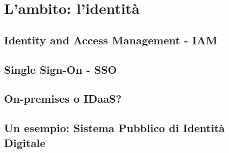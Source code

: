 \chapter{L'ambito: l'identità} \label{identita}

\section{Identity and Access Management - IAM}


\section{Single Sign-On - SSO}


\section{On-premises o IDaaS?}


\section{Un esempio: Sistema Pubblico di Identità Digitale}
 